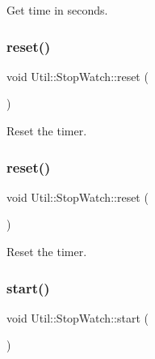 Get time in seconds. 

\mbox{\label{classUtil_1_1StopWatch_a59e537525567ed9e0701635fb60148b7}} 
\subsubsection{\texorpdfstring{reset()}{reset()}\hspace{0.1cm}{\footnotesize\ttfamily [1/2]}}
{\footnotesize\ttfamily void Util\+::\+Stop\+Watch\+::reset (\begin{DoxyParamCaption}{ }\end{DoxyParamCaption})}



Reset the timer. 

\mbox{\label{classUtil_1_1StopWatch_a59e537525567ed9e0701635fb60148b7}} 
\subsubsection{\texorpdfstring{reset()}{reset()}\hspace{0.1cm}{\footnotesize\ttfamily [2/2]}}
{\footnotesize\ttfamily void Util\+::\+Stop\+Watch\+::reset (\begin{DoxyParamCaption}{ }\end{DoxyParamCaption})}



Reset the timer. 

\mbox{\label{classUtil_1_1StopWatch_a87db8057d5ddf177cfcc9ae497337d13}} 
\subsubsection{\texorpdfstring{start()}{start()}\hspace{0.1cm}{\footnotesize\ttfamily [1/2]}}
{\footnotesize\ttfamily void Util\+::\+Stop\+Watch\+::start (\begin{DoxyParamCaption}{ }\end{DoxyParamCaption})}



